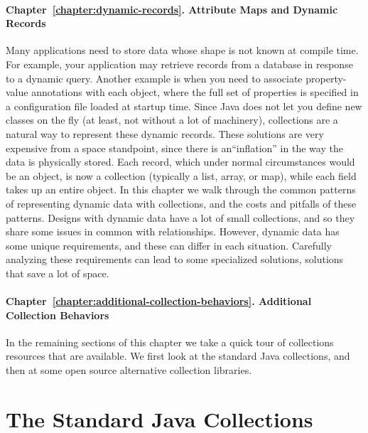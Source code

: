 \paragraph{Chapter~\ref{chapter:dynamic-records}. Attribute Maps and Dynamic
Records} Many applications need to store data whose shape is not
known at compile time. For example, your application may retrieve
records from a database in response to a dynamic query. Another example is when
you need to associate property-value annotations with each object, where the full set of
properties is specified in a configuration
file loaded at startup time.
Since Java does not let you define new classes on the fly (at
least, not without a lot of machinery), collections are a natural way to
represent these dynamic records. These solutions are very expensive from a
space standpoint, since there is an``inflation'' in the way the data is
physically stored. Each record, which under normal circumstances would be an
object, is now a collection (typically a list, array, or map), while each
field takes up an entire object.
In this chapter we walk through the
common patterns of representing dynamic data with collections, and
the costs and pitfalls of these patterns. Designs with dynamic data 
have a lot of small collections, and so they share some issues in
common with relationships. However, dynamic data has some unique requirements, and
these can differ in each situation. Carefully analyzing these
requirements can lead to some specialized solutions, solutions that save a lot
of space.

\paragraph{Chapter~\ref{chapter:additional-collection-behaviors}. Additional
Collection Behaviors} 

In the remaining sections of this chapter we take a quick tour of collections
resources that are available.  We first look at the standard Java
collections, and then at some open source alternative collection
libraries.

\section{The Standard Java Collections}

